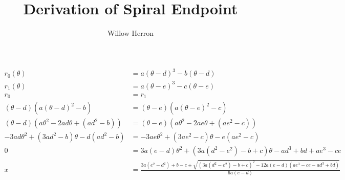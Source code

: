 \documentclass[a4paper,10pt]{article}
\title{Derivation of Spiral Endpoint}
\author{Willow Herron}
\begin{document}
	\maketitle
	\tiny \begin{align*}
		r_0(\theta) &= a(\theta-d)^3-b(\theta-d)\\
		r_1(\theta) &= a(\theta-e)^3-c(\theta-e)\\
		r_0 &= r_1\\
		(\theta-d)(a(\theta-d)^2-b) &= (\theta-e)(a(\theta-e)^2-c)\\
		(\theta-d)(a\theta^2-2ad\theta+(ad^2-b)) &= (\theta-e)(a\theta^2-2ae\theta+(ae^2-c))\\
		-3ad\theta^2+(3ad^2-b)\theta-d(ad^2-b)&=-3ae\theta^2+(3ae^2-c)\theta-e(ae^2-c)\\
		0 &= 3a(e-d)\theta^2+(3a(d^2-e^2)-b+c)\theta-ad^3+bd+ae^3-ce\\
		x &= \frac{3a(e^2-d^2)+b-c\pm\sqrt{(3a(d^2-e^2)-b+c)^2-12a(e-d)(ae^3-ce-ad^3+bd)}}{6a(e-d)}
	\end{align*}
\end{document}
